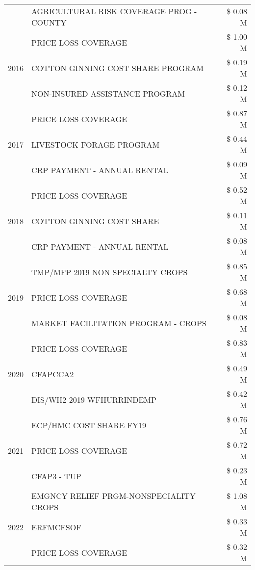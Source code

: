\begin{tabular}{llr}
 & AGRICULTURAL RISK COVERAGE PROG - COUNTY & \$ 0.08 M \\
\cline{1-3}
\multirow[t]{3}{*}{2016} & PRICE LOSS COVERAGE & \$ 1.00 M \\
 & COTTON GINNING COST SHARE PROGRAM & \$ 0.19 M \\
 & NON-INSURED ASSISTANCE PROGRAM & \$ 0.12 M \\
\cline{1-3}
\multirow[t]{3}{*}{2017} & PRICE LOSS COVERAGE & \$ 0.87 M \\
 & LIVESTOCK FORAGE PROGRAM & \$ 0.44 M \\
 & CRP PAYMENT - ANNUAL RENTAL & \$ 0.09 M \\
\cline{1-3}
\multirow[t]{3}{*}{2018} & PRICE LOSS COVERAGE & \$ 0.52 M \\
 & COTTON GINNING COST SHARE & \$ 0.11 M \\
 & CRP PAYMENT - ANNUAL RENTAL & \$ 0.08 M \\
\cline{1-3}
\multirow[t]{3}{*}{2019} & TMP/MFP 2019 NON SPECIALTY CROPS & \$ 0.85 M \\
 & PRICE LOSS COVERAGE & \$ 0.68 M \\
 & MARKET FACILITATION PROGRAM - CROPS & \$ 0.08 M \\
\cline{1-3}
\multirow[t]{3}{*}{2020} & PRICE LOSS COVERAGE & \$ 0.83 M \\
 & CFAPCCA2 & \$ 0.49 M \\
 & DIS/WH2 2019 WFHURRINDEMP & \$ 0.42 M \\
\cline{1-3}
\multirow[t]{3}{*}{2021} & ECP/HMC COST SHARE FY19 & \$ 0.76 M \\
 & PRICE LOSS COVERAGE & \$ 0.72 M \\
 & CFAP3 - TUP & \$ 0.23 M \\
\cline{1-3}
\multirow[t]{3}{*}{2022} & EMGNCY RELIEF PRGM-NONSPECIALITY CROPS & \$ 1.08 M \\
 & ERFMCFSOF & \$ 0.33 M \\
 & PRICE LOSS COVERAGE & \$ 0.32 M \\
\cline{1-3}
\bottomrule
\end{tabular}
